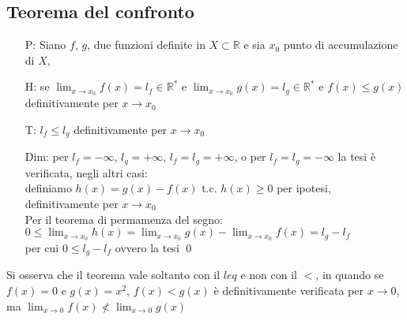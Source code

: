 \documentclass[a4paper]{article}
\begin{document}
\subsection{Teorema del confronto}
\begin{itemize}
	\item[P:] Siano \(f\), \(g\), due funzioni definite in \(X \subset \mathbb{R}\) e sia \(x_0\) punto di accumulazione di \(X\),
	\item[H:] se \(\displaystyle \lim_{x \to x_0} f(x) = l_f \in \mathbb{R}^*\) e \(\displaystyle \lim_{x \to x_0} g(x) = l_g \in \mathbb{R}^*\) e \(f(x) \leq g(x)\) definitivamente per \(x \to x_0\)
	\item[T:] \(l_f \leq l_g\) definitivamente per \(x \to x_0\)
	\item[Dim:] per \(l_f = -\infty\), \(l_g = + \infty\), \(l_f = l_g = + \infty\), o per \(l_f = l_g = - \infty\) la tesi è verificata, negli altri casi: \\
	definiamo \(h(x) = g(x) - f(x)\) t.c. \(h(x) \geq 0\) per ipotesi, definitivamente per \(x \to x_0\) \\
	Per il teorema di permamenza del segno: \(\displaystyle 0 \leq \lim_{x \to x_0} h(x) = \lim_{x \to x_0} g(x) - \lim_{x \to x_0} f(x) = l_g - l_f\) \\
	per cui \(0 \leq l_g - l_f\) ovvero la tesi \qed
\end{itemize}
Si osserva che il teorema vale soltanto con il \(leq\) e non con il \(<\), in quando se \(f(x) = 0\) e \(g(x) = x^2\),
\(f(x) < g(x)\) è definitivamente verificata per \(x \to 0\), ma \(\displaystyle \lim_{x \to 0} f(x) \nless \lim_{x \to 0} g(x)\)

\newpage
\end{document}
